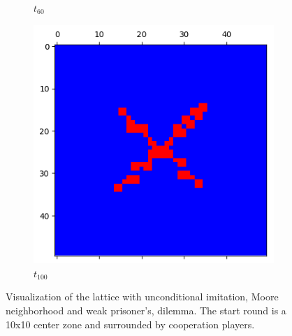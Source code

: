 \documentclass[letterpaper]{article}
\begin{document}
\begin{figure}[H]
\begin{subfigure}{.33\textwidth}
      \caption{$t_{60}$}
    \end{subfigure}
    \begin{subfigure}{.33\textwidth}
      \centering
      \includegraphics[width=1\linewidth]{images/assign2/part31-coop/t100}
      \caption{$t_{100}$}
    \end{subfigure}
    \caption{Visualization of the lattice with unconditional imitation,
    Moore neighborhood and weak prisoner's, dilemma. The start round is
    a 10x10 center zone and surrounded by cooperation players.}
    \label{fig:visupart31-coop}
\end{figure}
\end{document}
